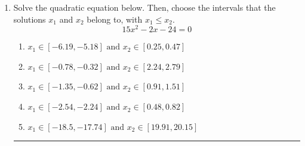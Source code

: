 \documentclass[14pt]{extbook}
\newcommand{\litem}[1]{\item#1\hspace*{-1cm}\rule{\textwidth}{0.4pt}}
\begin{document}
\begin{enumerate}
{\begin{enumerate}[label=\Alph*.]
\end{enumerate} }
\litem{
Solve the quadratic equation below. Then, choose the intervals that the solutions $x_1$ and $x_2$ belong to, with $x_1 \leq x_2$.\[ 15x^{2} -2 x -24 = 0 \]\begin{enumerate}[label=\Alph*.]
\item \( x_1 \in [-6.19, -5.18] \text{ and } x_2 \in [0.25, 0.47] \)
\item \( x_1 \in [-0.78, -0.32] \text{ and } x_2 \in [2.24, 2.79] \)
\item \( x_1 \in [-1.35, -0.62] \text{ and } x_2 \in [0.91, 1.51] \)
\item \( x_1 \in [-2.54, -2.24] \text{ and } x_2 \in [0.48, 0.82] \)
\item \( x_1 \in [-18.5, -17.74] \text{ and } x_2 \in [19.91, 20.15] \)


\end{enumerate}}
\end{enumerate}
\end{document}
